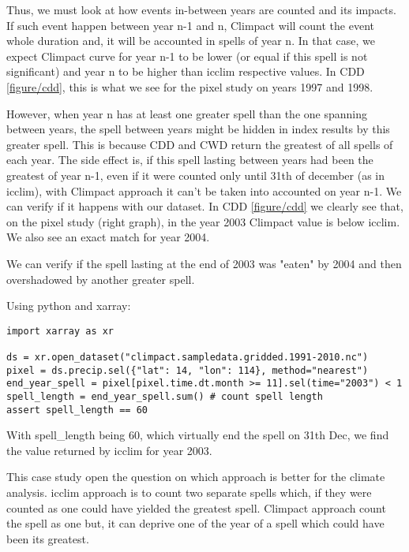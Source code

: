 \documentclass[a4paper,11pt]{article}
\begin{document}
            Thus, we must look at how events in-between years are counted and its impacts.
            If such event happen between year n-1 and n, Climpact will count the event whole duration and, it will be accounted in spells of year n.
            In that case, we expect Climpact curve for year n-1 to be lower (or equal if this spell is not significant) and year n to be higher than icclim respective values.
            In CDD \ref{figure/cdd}, this is what we see for the pixel study on years 1997 and 1998.

            However, when year n has at least one greater spell than the one spanning between years, the spell between years might be hidden in index results by this greater spell.
            This is because CDD and CWD return the greatest of all spells of each year.
            The side effect is, if this spell lasting between years had been the greatest of year n-1, even if it were counted only until 31th of december (as in icclim), with Climpact approach it can't be taken into accounted on year n-1.
            We can verify if it happens with our dataset. In CDD \ref{figure/cdd} we clearly see that, on the pixel study (right graph), in the year 2003 Climpact value is below icclim.
            We also see an exact match for year 2004.
            
            We can verify if the spell lasting at the end of 2003 was "eaten" by 2004 and then overshadowed by another greater spell. 
            
            Using python and xarray:
            
            \begin{minipage}{\linewidth}
            \begin{lstlisting}
import xarray as xr

ds = xr.open_dataset("climpact.sampledata.gridded.1991-2010.nc")
pixel = ds.precip.sel({"lat": 14, "lon": 114}, method="nearest")
end_year_spell = pixel[pixel.time.dt.month >= 11].sel(time="2003") < 1
spell_length = end_year_spell.sum() # count spell length
assert spell_length == 60
            \end{lstlisting}
            \end{minipage}

            With spell\_length being 60, which virtually end the spell on 31th Dec, we find the value returned by icclim for year 2003.

            This case study open the question on which approach is better for the climate analysis.
            icclim approach is to count two separate spells which, if they were counted as one could have yielded the greatest spell.
            Climpact approach count the spell as one but, it can deprive one of the year of a spell which could have been its greatest.
\end{document}
